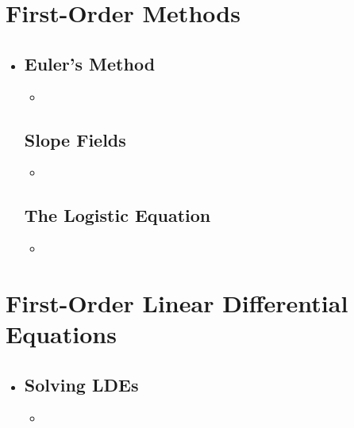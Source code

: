 \section{First-Order Methods}
\begin{itemize}
  \item []

  \subsection{Euler's Method}
  \begin{itemize}
    \item
  \end{itemize}

  \subsection{Slope Fields}
  \begin{itemize}
    \item
  \end{itemize}

  \subsection{The Logistic Equation}
  \begin{itemize}
    \item
  \end{itemize}

\end{itemize}


\section{First-Order Linear Differential Equations}
\begin{itemize}
  \item []

  \subsection{Solving LDEs}
  \begin{itemize}
    \item
  \end{itemize}


\end{itemize}

